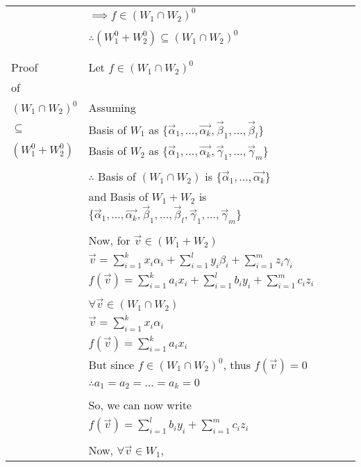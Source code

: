 \begin{longtable}{|l|l|}
        & $\implies f \in (W_1 \cap W_2)^0$\\
        & \\
        & $\therefore (W_1^0 + W_2^0) \subseteq (W_1 \cap W_2)^0$\\
        & \\
    \hline
        & \\
        Proof & Let $f \in (W_1 \cap W_2)^0$\\
        of & \\
        $(W_1 \cap W_2)^0$ & Assuming\\
        $\subseteq$ & Basis of $W_1$ as $\{ \vec{\alpha}_1,\ldots,\vec{\alpha_k}, \vec{\beta}_1,\ldots,\vec{\beta}_l \}$\\
        $(W_1^0 + W_2^0)$ & Basis of $W_2$ as $\{ \vec{\alpha}_1,\ldots,\vec{\alpha_k}, \vec{\gamma}_1,\ldots,\vec{\gamma}_m \}$\\
        & \\
        & $\therefore$ Basis of $(W_1 \cap W_2)$ is $\{ \vec{\alpha}_1,\ldots,\vec{\alpha_k} \}$\\
        & and Basis of $W_1 + W_2$ is $\{ \vec{\alpha}_1,\ldots,\vec{\alpha_k}, \vec{\beta}_1,\ldots,\vec{\beta}_l, \vec{\gamma}_1,\ldots,\vec{\gamma}_m\}$\\
        & \\
        & Now, for $\vec{v} \in (W_1 + W_2)$\\
        & $\vec{v} = \sum_{i=1}^{k} x_i\alpha_i + \sum_{i=1}^{l} y_i\beta_i + \sum_{i=1}^{m} z_i\gamma_i$\\
        & $f(\vec{v}) = \sum_{i=1}^{k} a_ix_i + \sum_{i=1}^{l} b_iy_i + \sum_{i=1}^{m} c_iz_i$\\
        & \\
        & $\forall \vec{v} \in (W_1 \cap W_2)$\\
        & $\vec{v} = \sum_{i=1}^{k} x_i\alpha_i$\\
    \hline
        & $f(\vec{v}) = \sum_{i=1}^{k} a_ix_i$\\
        & But since $f \in (W_1 \cap W_2)^0$, thus $f(\vec{v}) = 0$\\
        & $\therefore a_1 = a_2 = \ldots = a_k = 0$\\
        & \\
        & So, we can now write\\
        & $f(\vec{v}) = \sum_{i=1}^{l} b_iy_i + \sum_{i=1}^{m} c_iz_i$\\
        & \\
        & Now, $\forall \vec{v} \in W_1$,\\

\end{longtable}
